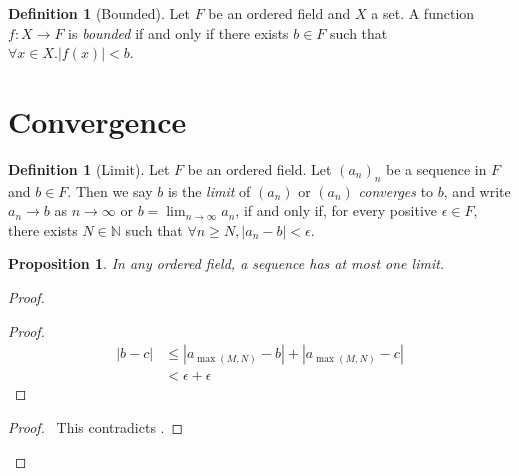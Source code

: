 \documentclass{article}
\let\qed\relax
\newtheorem{proposition}[axiom]{Proposition}
\theoremstyle{definition}
\newtheorem{definition}[axiom]{Definition}
\begin{document}
    \begin{definition}[Bounded]
        Let $F$ be an ordered field and $X$ a set. A function $f : X \rightarrow F$ is \emph{bounded} if and
        only if there exists $b \in F$ such that $\forall x \in X. |f(x)| < b$.
    \end{definition}

    \section{Convergence}

    \begin{definition}[Limit]
        Let $F$ be an ordered field. Let $(a_n)_n$ be a sequence in $F$ and $b \in F$. Then we say $b$ is the
        \emph{limit} of $(a_n)$ or $(a_n)$ \emph{converges} to $b$, and write $a_n \rightarrow b$ as
        $n \rightarrow \infty$ or 
        $b = \lim_{n \rightarrow \infty} a_n$, if and only if,
        for every positive $\epsilon \in F$, there exists $N \in \mathbb{N}$ such that
        $\forall n \geq N, |a_n - b| < \epsilon$.
    \end{definition}

    \begin{proposition}
        In any ordered field, a sequence has at most one limit.
    \end{proposition}

    \begin{proof}
        \pf
        \begin{proof}
            \pf
            \begin{align*}
                |b-c| & \leq |a_{\max(M,N)} - b| + |a_{\max(M,N)} - c| \\
                & < \epsilon + \epsilon
            \end{align*}
        \end{proof}
        \qedstep
        \begin{proof}
            \pf\ This contradicts .
        \end{proof}
        \qed
    \end{proof}
\end{document}
